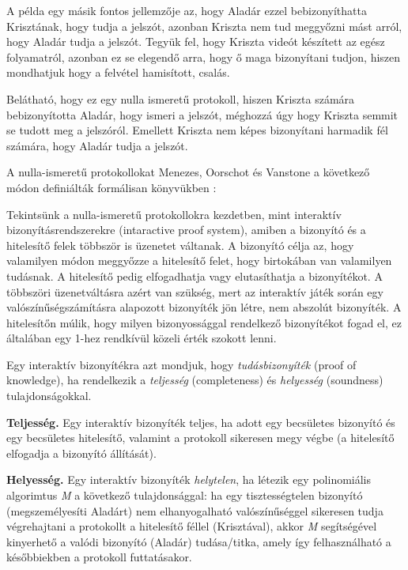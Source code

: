 A példa egy másik fontos jellemzője az, hogy Aladár ezzel bebizonyíthatta Krisztának, hogy tudja a jelszót, azonban Kriszta nem tud meggyőzni mást arról, hogy Aladár tudja a jelszót. Tegyük fel, hogy Kriszta videót készített az egész folyamatról, azonban ez se elegendő arra, hogy ő maga bizonyítani tudjon, hiszen mondhatjuk hogy a felvétel hamisított, csalás.

Belátható, hogy ez egy nulla ismeretű protokoll, hiszen Kriszta számára bebizonyította Aladár, hogy ismeri a jelszót, méghozzá úgy hogy Kriszta semmit se tudott meg a jelszóról. Emellett Kriszta nem képes bizonyítani harmadik fél számára, hogy Aladár tudja a jelszót.

A nulla-ismeretű protokollokat Menezes, Oorschot és Vanstone a következő módon definiálták formálisan könyvükben \citeyear{menezes1997handbook}:

Tekintsünk a nulla-ismeretű protokollokra kezdetben, mint interaktív bizonyításrendszerekre (intaractive proof system), amiben a bizonyító és a hitelesítő felek többször is üzenetet váltanak. A bizonyító célja az, hogy valamilyen módon meggyőzze a hitelesítő felet, hogy birtokában van valamilyen tudásnak. A hitelesítő pedig elfogadhatja vagy elutasíthatja a bizonyítékot. A többszöri üzenetváltásra azért van szükség, mert az interaktív játék során egy valószínűségszámításra alapozott bizonyíték jön létre, nem abszolút bizonyíték. A hitelesítőn múlik, hogy milyen bizonyossággal rendelkező bizonyítékot fogad el, ez általában egy 1-hez rendkívül közeli érték szokott lenni.

Egy interaktív bizonyítékra azt mondjuk, hogy \textit{tudásbizonyíték} (proof of knowledge), ha rendelkezik a \textit{teljesség} (completeness) és \textit{helyesség} (soundness) tulajdonságokkal.

\begin{definition}
    \textbf{Teljesség.} Egy interaktív bizonyíték teljes, ha adott egy becsületes bizonyító és egy becsületes hitelesítő, valamint a protokoll sikeresen megy végbe (a hitelesítő elfogadja a bizonyító állítását).
\end{definition}

\begin{definition}
    \textbf{Helyesség.} Egy interaktív bizonyíték \textit{helytelen}, ha létezik egy polinomiális algorimtus \textit{M} a következő tulajdonsággal: ha egy tisztességtelen bizonyító (megszemélyesíti Aladárt) nem elhanyogalható valószínűséggel sikeresen tudja végrehajtani a protokollt a hitelesítő féllel (Krisztával), akkor \textit{M} segítségével kinyerhető a valódi bizonyító (Aladár) tudása/titka, amely így felhasználható a későbbiekben a protokoll futtatásakor.
\end{definition}

